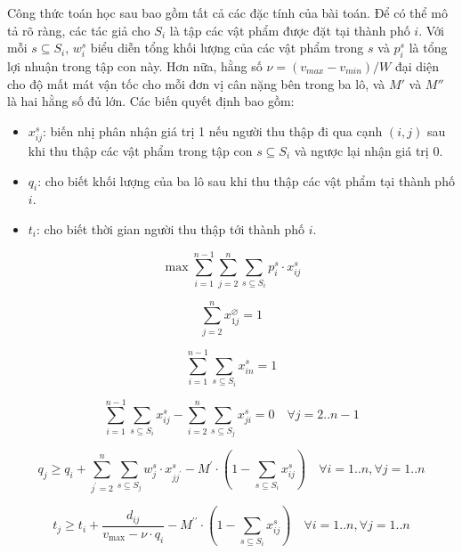 Công thức toán học sau bao gồm tất cả các đặc tính của bài toán. Để có thể mô tả rõ ràng, các tác giả cho $S_i$ là tập các vật phẩm được đặt tại thành phố $i$. Với mỗi $s\subseteq S_i$, $w_i^s$ biểu diễn tổng khối lượng của các vật phẩm trong $s$ và $p_i^s$ là tổng lợi nhuận trong tập con này. Hơn nữa, hằng số $\nu=(v_{max} - v_{min})/W$ đại diện cho độ mất mát vận tốc cho mỗi đơn vị cân nặng bên trong ba lô, và $M'$ và $M''$ là hai hằng số đủ lớn. Các biến quyết định bao gồm:
\begin{itemize}
    \item $x_{ij}^s$: biến nhị phân nhận giá trị 1 nếu người thu thập đi qua cạnh $(i, j)$ sau khi thu thập các vật phẩm trong tập con $s\subseteq S_i$ và ngược lại nhận giá trị 0.
    \item $q_i$: cho biết khối lượng của ba lô sau khi thu thập các vật phẩm tại thành phố $i$.
    \item $t_i$: cho biết thời gian người thu thập tới thành phố $i$.
\end{itemize}

\begin{equation}\label{eq:thop1}
    \max \sum_{i=1}^{n-1} \sum_{j=2}^n \sum_{s \subseteq S_i} p_i^s \cdot x_{i j}^s
\end{equation}

\begin{equation}\label{eq:thop2}
    \sum_{j=2}^n x_{1 j}^{\varnothing}=1
\end{equation}

\begin{equation}\label{eq:thop3}
    \sum_{i=1}^{n-1} \sum_{s \subseteq S_i} x_{i n}^s=1
\end{equation}

\begin{equation}\label{eq:thop4}
    \sum_{i=1}^{n-1} \sum_{s \subseteq S_i} x_{i j}^s-\sum_{i=2}^n \sum_{s \subseteq S_j} x_{j i}^s=0 \quad \forall j=2 . . n-1
\end{equation}

\begin{equation}\label{eq:thop5}
    q_j \geq q_i +\sum_{j^{\prime}=2}^n \sum_{s \subseteq S_j} w_j^s \cdot x_{j j^{\prime}}^s-M^{\prime} \cdot\left(1-\sum_{s \subseteq S_i} x_{i j}^s\right) \quad \forall i=1 .. n, \forall j=1..n 
\end{equation}

\begin{equation}\label{eq:thop6}
    t_j \geq t_i+ \frac{d_{i j}}{v_{\max }-\nu \cdot q_i} -M^{\prime \prime} \cdot\left(1-\sum_{s \subseteq S_i} x_{i j}^s\right) \quad \forall i=1 .. n, \forall j=1..n 
\end{equation}


